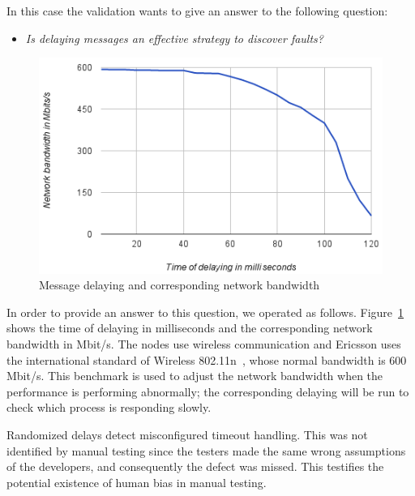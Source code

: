 In this case the validation wants to give an answer to the following question: 

 \begin{itemize}
 \item {\em Is delaying messages an effective strategy to discover faults?} 
 \end{itemize}

\begin{figure}[hh!]
\centering
\includegraphics[width=\columnwidth]{figure/bendelay.png}
\caption{Message delaying and corresponding network bandwidth \label{bendelay}}
\end{figure}

In order to provide an answer to this question, we operated as follows. 
Figure~\ref{bendelay} shows the time of delaying in milliseconds and the corresponding network bandwidth in Mbit/s. The nodes use wireless communication and Ericsson uses the international standard of Wireless 802.11n~\cite{Wireless}, whose normal bandwidth is 600 Mbit/s. This benchmark is used to adjust the %
network bandwidth when the performance is performing abnormally; the corresponding delaying will be run to check which process is responding slowly.

Randomized delays detect misconfigured timeout handling. This was not identified by manual testing since the testers made the same wrong assumptions of the developers, %
and consequently the defect was missed. This testifies the potential existence of human bias in manual testing.


